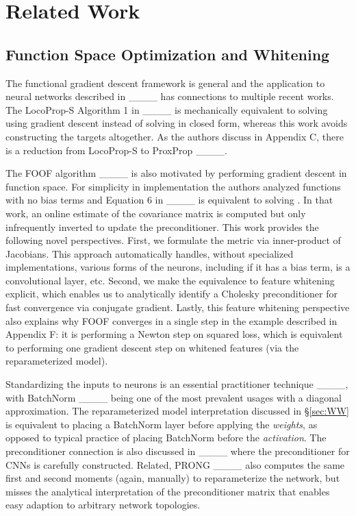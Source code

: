 \section{Related Work}
\label{sec:connections}
\subsection{Function Space Optimization and Whitening}
The functional gradient descent framework is general and the 
application to neural networks described in ____ has connections to
multiple recent works. The LocoProp-S Algorithm 1 in ____
is mechanically equivalent to solving  using gradient descent
instead of solving in closed form, whereas this work avoids constructing the targets altogether.
As the authors discuss in Appendix C,
there is a reduction from LocoProp-S to ProxProp ____.

The FOOF algorithm ____ is also motivated by performing gradient descent
in function space. For simplicity in implementation the authors analyzed functions
with no bias terms and Equation 6 in ____ is equivalent to
solving . In that work, an online estimate of the 
covariance matrix is computed but only infrequently inverted to update the
preconditioner. This work provides the following novel perspectives. First, 
we formulate the metric via inner-product of Jacobians. This approach
automatically handles, without specialized implementations, various forms of the neurons,
including if it has a bias term, is a convolutional layer, etc. 
Second, we make the equivalence to feature whitening explicit, which enables 
us to analytically identify a Cholesky preconditioner for fast convergence via
conjugate gradient. Lastly, this feature whitening perspective also
explains why FOOF converges in a single step in the example described in Appendix F:
it is performing a Newton step on squared loss, which is equivalent to performing one
gradient descent step on whitened features (via the reparameterized model).

Standardizing the inputs to neurons is an essential practitioner technique ____,
with BatchNorm ____ being one of the most prevalent
usages with a diagonal approximation. The reparameterized model interpretation discussed in
\S \ref{sec:WW} is equivalent to placing a BatchNorm layer before applying the \emph{weights},
as opposed to typical practice of placing BatchNorm before the
\emph{activation}. The preconditioner connection is also discussed in ____
where the preconditioner for CNNs is carefully constructed.
Related, PRONG ____ also computes the same first and
second moments (again, manually) to reparameterize the network, but misses the analytical interpretation
of the preconditioner matrix that enables easy adaption to arbitrary network topologies.

